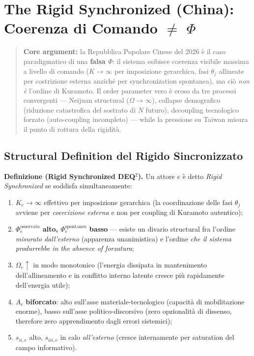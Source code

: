 \chapter{\texorpdfstring{The Rigid Synchronized (China): Coerenza di
Comando $\neq$
\(\Phi\)}{The Rigid Synchronized (China): Coerenza di Comando $\neq$ \textbackslash Phi}}\label{il-rigido-sincronizzato-cina-coerenza-di-comando-phi}

\begin{quote}
\textbf{Core argument:} la Repubblica Popolare Cinese del 2026 è il
caso paradigmatico di una \textbf{falsa \(\Phi\)}: il sistema esibisce
coerenza visibile massima a livello di comando (\(K \to \infty\) per
imposizione gerarchica, fasi \(\theta_j\) allineate per costrizione
esterna anziché per synchronization spontanea), ma ciò \emph{non è}
l'ordine di Kuramoto. Il order parameter vero è eroso da tre processi
convergenti --- Neijuan structural (\(\Omega \to \infty\)), collapse
demografico (riduzione catastrofica del sostrato di \(N\) futuro),
decoupling tecnologico forzato (auto-coupling incompleto) ---
while la pressione su Taiwan misura il punto di rottura della rigidità.
\end{quote}



\section{Structural Definition del Rigido
Sincronizzato}\label{definition-structural-del-rigido-sincronizzato}

\Hypoth{} \textbf{Definizione (Rigid Synchronized DEQ$^2$).} Un attore
\(e\) è detto \emph{Rigid Synchronized} se soddisfa simultaneamente:

\begin{enumerate}
\def\labelenumi{\arabic{enumi}.}
\tightlist
\item
  \(K_e \to \infty\) effettivo per imposizione gerarchica (la
  coordinazione delle fasi \(\theta_j\) avviene per \emph{coercizione
  esterna} e non per coupling di Kuramoto autentico);
\item
  \textbf{\(\Phi_e^{\text{osservato}}\) alto,
  \(\Phi_e^{\text{spontaneo}}\) basso} --- esiste un divario structural
  fra l'ordine \emph{misurato dall'esterno} (apparenza unanimistica) e
  l'ordine \emph{che il sistema produrrebbe in the absence of forzatura};
\item
  \(\Omega_e \uparrow\) in modo monotonico (l'energia dissipata in
  mantenimento dell'allineamento e in conflitto interno latente cresce
  più rapidamente dell'energia utile);
\item
  \(A_e\) \textbf{biforcato}: alto sull'asse materiale-tecnologico
  (capacità di mobilitazione enorme), basso sull'asse
  politico-discorsivo (zero opzionalità di dissenso, therefore zero
  apprendimento dagli errori sistemici);
\item
  \(s_{ii,e}\) alto, \(s_{iii,e}\) in calo \emph{all'esterno} (cresce
  internamente per saturation del campo informativo).
\end{enumerate}

